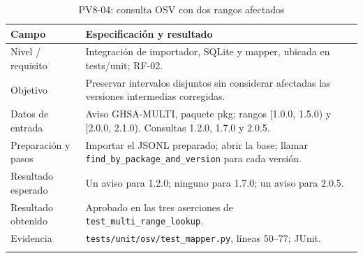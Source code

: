 \begin{table}[H]
\centering\small{}
\caption{PV8-04: consulta OSV con dos rangos afectados}
\begin{tabularx}{\textwidth}{P{3.5cm}Y}
\toprule
\textbf{Campo} & \textbf{Especificación y resultado} \\
\midrule
Nivel / requisito & Integración de importador, SQLite y mapper, ubicada en tests/unit; RF-02. \\
\addlinespace
Objetivo & Preservar intervalos disjuntos sin considerar afectadas las versiones intermedias corregidas. \\
\addlinespace
Datos de entrada & Aviso GHSA-MULTI, paquete pkg; rangos [1.0.0, 1.5.0) y [2.0.0, 2.1.0). Consultas 1.2.0, 1.7.0 y 2.0.5. \\
\addlinespace
Preparación y pasos & Importar el JSONL preparado; abrir la base; llamar \texttt{find\_\allowbreak by\_\allowbreak package\_\allowbreak and\_\allowbreak version} para cada versión. \\
\addlinespace
Resultado esperado & Un aviso para 1.2.0; ninguno para 1.7.0; un aviso para 2.0.5. \\
\addlinespace
Resultado obtenido & Aprobado en las tres aserciones de \texttt{test\_\allowbreak multi\_\allowbreak range\_\allowbreak lookup}. \\
\addlinespace
Evidencia & \texttt{tests/\allowbreak unit/\allowbreak osv/\allowbreak test\_\allowbreak mapper.\allowbreak py}, líneas 50--77; JUnit. \\
\addlinespace
\bottomrule
\end{tabularx}
\end{table}
